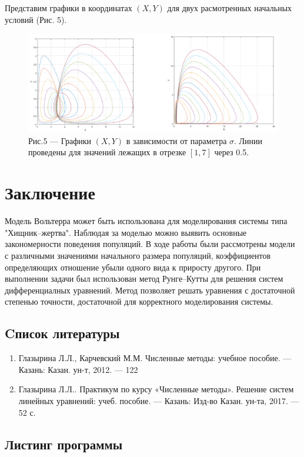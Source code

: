 \documentclass[a4paper,12pt]{article}
\begin{document}
Представим графики в координатах $(X, Y)$ для двух расмотренных начальных условий (Рис. 5).
\begin{figure}[h]
    \centering
    \includegraphics[width=1\linewidth]{pictures/task4.png}
    \captionsetup{labelformat=empty}
    \caption{Рис.5 --- Графики $(X, Y)$ в зависимости от параметра $\sigma$. Линии проведены для значений лежащих
    в отрезке $[1, 7]$ через 0.5.}
\end{figure}

\newpage
\section{Заключение}
\hspace{0.5cm} Модель Вольтерра может быть использована для моделирования системы типа "Хищник--жертва".
Наблюдая за моделью можно выявить основные закономерности поведения популяций. В ходе работы были рассмотрены
модели с различными значениями начального размера популяций, коэффициентов определяющих отношение убыли 
одного вида к приросту другого. При выполнении задачи был использован метод Рунге--Кутты для решения систем 
дифференциалных уравнений. Метод позволяет решать уравнения с достаточной степенью точности, достаточной для 
корректного моделирования системы.
\newpage

\begin{center}
\section{Cписок литературы}
\end{center}
\begin{enumerate}
    \item Глазырина Л.Л., Карчевский М.М. Численные методы: учебное пособие. — Казань: Казан.
    ун-т, 2012. — 122 
    \item Глазырина Л.Л.. Практикум по курсу «Численные методы». Решение
    систем линейных уравнений: учеб. пособие. — Казань: Изд-во Казан. ун-та, 2017. — 52 с.
\end{enumerate}
\newpage

\begin{center}
\section{Листинг программы}
\end{center}

\end{document}
